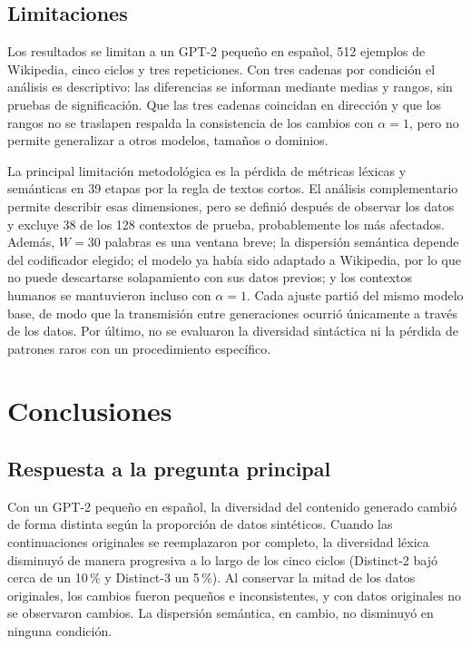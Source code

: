 \documentclass[12pt,letterpaper]{article}
\begin{document}
\subsection{Limitaciones}

Los resultados se limitan a un GPT-2 pequeño en español, 512 ejemplos de
Wikipedia, cinco ciclos y tres repeticiones. Con tres cadenas por condición
el análisis es descriptivo: las diferencias se informan mediante medias y
rangos, sin pruebas de significación. Que las tres cadenas coincidan en
dirección y que los rangos no se traslapen respalda la consistencia de los
cambios con \(\alpha=1\), pero no permite generalizar a otros modelos,
tamaños o dominios.

La principal limitación metodológica es la pérdida de métricas léxicas y
semánticas en 39 etapas por la regla de textos cortos. El análisis
complementario permite describir esas dimensiones, pero se definió después
de observar los datos y excluye 38 de los 128 contextos de prueba,
probablemente los más afectados. Además, \(W=30\) palabras es una ventana
breve; la dispersión semántica depende del codificador elegido; el modelo
ya había sido adaptado a Wikipedia, por lo que no puede descartarse
solapamiento con sus datos previos; y los contextos humanos se mantuvieron
incluso con \(\alpha=1\). Cada ajuste partió del mismo modelo base, de modo
que la transmisión entre generaciones ocurrió únicamente a través de los
datos. Por último, no se evaluaron la diversidad sintáctica ni la pérdida
de patrones raros con un procedimiento específico.

\section{Conclusiones}

\subsection{Respuesta a la pregunta principal}

Con un GPT-2 pequeño en español, la diversidad del contenido generado
cambió de forma distinta según la proporción de datos sintéticos. Cuando
las continuaciones originales se reemplazaron por completo, la diversidad
léxica disminuyó de manera progresiva a lo largo de los cinco ciclos
(Distinct-2 bajó cerca de un 10\,\% y Distinct-3 un 5\,\%). Al conservar
la mitad de los datos originales, los cambios fueron pequeños e
inconsistentes, y con datos originales no se observaron cambios. La
dispersión semántica, en cambio, no disminuyó en ninguna condición.
\end{document}
